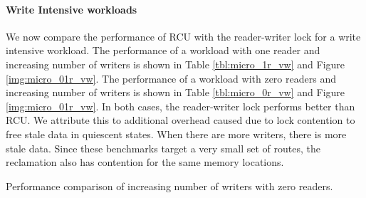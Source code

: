 \documentclass[a4paper]{article}
\begin{document}
\paragraph{Write Intensive workloads}
We now compare the performance of RCU with the reader-writer lock for a write intensive workload. The performance of a workload with one reader and increasing number of writers is shown in Table \ref{tbl:micro_1r_vw} and Figure \ref{img:micro_01r_vw}. The performance of a workload with zero readers and increasing number of writers is shown in Table \ref{tbl:micro_0r_vw} and Figure \ref{img:micro_01r_vw}. In both cases, the reader-writer lock performs better than RCU. We attribute this to additional overhead caused due to lock contention to free stale data in quiescent states. When there are more writers, there is more stale data. Since these benchmarks target a very small set of routes, the reclamation also has contention for the same memory locations.

\begin{table}[tph]
\begin{center}

\end{center}
\label{tbl:micro_0r_vw}
\caption{Performance comparison of increasing number of writers with zero readers.}
\end{table}
\end{document}
